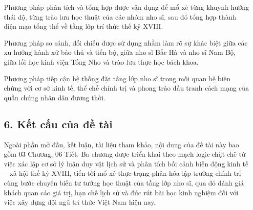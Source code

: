 Phương pháp phân tích và tổng hợp được vận dụng để mổ xẻ từng khuynh hướng thái độ, từng trào lưu học thuật của các nhóm nho sĩ, sau đó tổng hợp thành diện mạo tổng thể về tầng lớp trí thức thế kỷ XVIII.

Phương pháp so sánh, đối chiếu được sử dụng nhằm làm rõ sự khác biệt giữa các xu hướng hành xử bảo thủ và tiến bộ, giữa nho sĩ Bắc Hà và nho sĩ Nam Bộ, giữa lối học kinh viện Tống Nho và trào lưu thực học bách khoa.

Phương pháp tiếp cận hệ thống đặt tầng lớp nho sĩ trong mối quan hệ biện chứng với cơ sở kinh tế, thể chế chính trị và phong trào đấu tranh cách mạng của quần chúng nhân dân đương thời.

\subsection*{6. Kết cấu của đề tài}

Ngoài phần mở đầu, kết luận, tài liệu tham khảo, nội dung của đề tài này bao gồm 03 Chương, 06 Tiết. Ba chương được triển khai theo mạch logic chặt chẽ từ việc xác lập cơ sở lý luận duy vật lịch sử và phân tích bối cảnh biến động kinh tế -- xã hội thế kỷ XVIII, tiến tới mổ xẻ thực trạng phân hóa lập trường chính trị cùng bước chuyển biến tư tưởng học thuật của tầng lớp nho sĩ, qua đó đánh giá khách quan các giá trị, hạn chế lịch sử và đúc rút bài học kinh nghiệm đối với việc xây dựng đội ngũ trí thức Việt Nam hiện nay.

